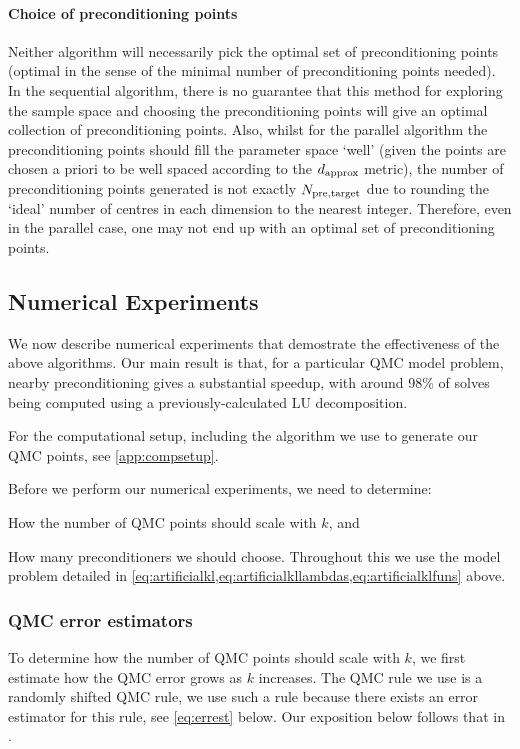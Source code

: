 \paragraph{Choice of preconditioning points} Neither algorithm will necessarily pick the optimal set of preconditioning points (optimal in the sense of the minimal number of preconditioning points needed). In the sequential algorithm, there is no guarantee that this method for exploring the sample space and choosing the preconditioning points will give an optimal collection of preconditioning points. Also, whilst for the parallel algorithm the preconditioning points should fill the parameter space `well' (given the points are chosen a priori to be well spaced according to the $d_{\mathrm{approx}}$ metric), the number of preconditioning points generated is not exactly $N_{\mathrm{pre,target}}$ due to rounding the `ideal' number of centres in each dimension to the nearest integer. Therefore, even in the parallel case, one may not end up with an optimal set of preconditioning points.

\subsection{Numerical Experiments}\label{sec:nbpcqmcnumerics}
We now describe numerical experiments that demostrate the effectiveness of the above algorithms.         Our main result is that, for a particular QMC model problem, nearby preconditioning gives a substantial speedup, with around 98\% of solves being computed using a previously-calculated LU decomposition.

For the computational setup, including the algorithm we use to generate our QMC points, see \cref{app:compsetup}.

Before we perform our numerical experiments, we need to determine:
\bit
\item How the number of QMC points should scale with $k$, and
  \item How many preconditioners we should choose.
    \eit
    Throughout this  we use the model problem detailed in \cref{eq:artificialkl,eq:artificialkllambdas,eq:artificialklfuns} above.

\subsubsection{QMC error estimators}
    
    To determine how the number of QMC points should scale with $k$, we first estimate how the QMC error grows as $k$ increases. The QMC rule we use is a randomly shifted QMC rule, we use such a rule because there exists an error estimator for this rule, see \cref{eq:errest} below. Our exposition below follows that in \cite[Section 4.2]{GrKuNuScSl:11}.

